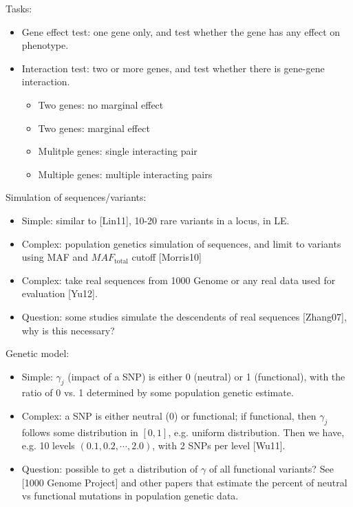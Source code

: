 \documentclass[11pt]{article}
\begin{document}
\begin{enumerate}
Tasks: 
\begin{itemize}
\item Gene effect test: one gene only, and test whether the gene has any effect on phenotype. 
\item Interaction test: two or more genes, and test whether there is gene-gene interaction.
\begin{itemize}
\item Two genes: no marginal effect
\item Two genes: marginal effect
\item Mulitple genes: single interacting pair
\item Multiple genes: multiple interacting pairs
\end{itemize}
\end{itemize}

Simulation of sequences/variants: 
\begin{itemize}
\item Simple: similar to [Lin11], 10-20 rare variants in a locus, in LE. 
\item Complex: population genetics simulation of sequences, and limit to variants using MAF and $MAF_{\text{total}}$ cutoff [Morris10]
\item Complex: take real sequences from 1000 Genome or any real data used for evaluation [Yu12].
\item Question: some studies simulate the descendents of real sequences [Zhang07], why is this necessary?  
\end{itemize}

Genetic model:
\begin{itemize}
\item Simple: $\gamma_j$ (impact of a SNP) is either 0 (neutral) or 1 (functional), with the ratio of 0 vs. 1 determined by some population genetic estimate. 
\item Complex: a SNP is either neutral (0) or functional; if functional, then $\gamma_j$ follows some distribution in $[0,1]$, e.g. uniform distribution. Then we have, e.g. 10 levels $(0.1,0.2,\cdots,2.0)$, with 2 SNPs per level [Wu11]. 
\item Question: possible to get a distribution of $\gamma$ of all functional variants? See [1000 Genome Project] and other papers that estimate the percent of neutral vs functional mutations in population genetic data. 
\end{itemize}
 

\end{enumerate}
\end{document}
